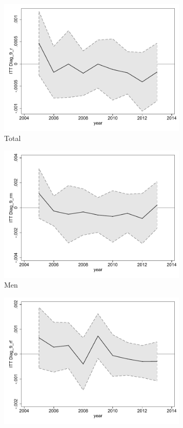 \documentclass[a4paper ]{article}
\begin{document}
\begin{figure}[h!]
	\centering
	\begin{subfigure}[t]{0.31\textwidth}
		\centering
		\includegraphics[width=0.99\textwidth]{R1_LC_Diag_9_r}
		\caption{Total}		
	\end{subfigure}
	\begin{subfigure}[t]{0.31\textwidth}
		\centering
		\includegraphics[width=0.99\textwidth]{R1_LC_Diag_9_rm}
		\caption{Men}		
	\end{subfigure}
	\quad
	\begin{subfigure}[t]{0.31\textwidth}
		\centering
		\includegraphics[width=0.99\textwidth]{R1_LC_Diag_9_rf}

\end{subfigure}
\end{figure}
\end{document}
